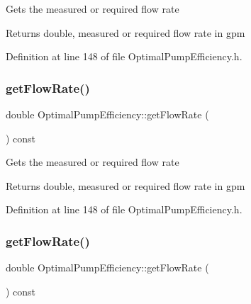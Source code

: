 Gets the measured or required flow rate

\begin{DoxyReturn}{Returns}
double, measured or required flow rate in gpm 
\end{DoxyReturn}


Definition at line 148 of file Optimal\+Pump\+Efficiency.\+h.

\mbox{\label{class_optimal_pump_efficiency_a77c6618681b0fd3a0fc02dc49d16ee99}} 
\subsubsection{\texorpdfstring{get\+Flow\+Rate()}{getFlowRate()}\hspace{0.1cm}{\footnotesize\ttfamily [2/3]}}
{\footnotesize\ttfamily double Optimal\+Pump\+Efficiency\+::get\+Flow\+Rate (\begin{DoxyParamCaption}{ }\end{DoxyParamCaption}) const\hspace{0.3cm}{\ttfamily [inline]}}

Gets the measured or required flow rate

\begin{DoxyReturn}{Returns}
double, measured or required flow rate in gpm 
\end{DoxyReturn}


Definition at line 148 of file Optimal\+Pump\+Efficiency.\+h.

\mbox{\label{class_optimal_pump_efficiency_a77c6618681b0fd3a0fc02dc49d16ee99}} 
\subsubsection{\texorpdfstring{get\+Flow\+Rate()}{getFlowRate()}\hspace{0.1cm}{\footnotesize\ttfamily [3/3]}}
{\footnotesize\ttfamily double Optimal\+Pump\+Efficiency\+::get\+Flow\+Rate (\begin{DoxyParamCaption}{ }\end{DoxyParamCaption}) const\hspace{0.3cm}{\ttfamily [inline]}}

